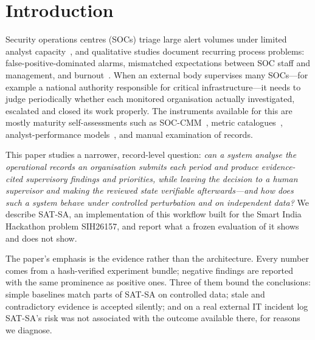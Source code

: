 \section{Introduction}
\label{sec:intro}

Security operations centres (SOCs) triage large alert volumes under limited analyst
capacity~\citep{vielberth2020soc,tariq2025alertfatigue}, and qualitative studies
document recurring process problems: false-positive-dominated alarms, mismatched
expectations between SOC staff and management, and burnout~\citep{alahmadi2022falsepositives,kokulu2019soc,sundaramurthy2015burnout}.
When an external body supervises many SOCs---for example a national authority
responsible for critical infrastructure---it needs to judge periodically whether
each monitored organisation actually investigated, escalated and closed its work
properly. The instruments available for this are mostly maturity self-assessments
such as SOC-CMM~\citep{vanos2016soccmm}, metric catalogues~\citep{forsberg2023metrics},
analyst-performance models~\citep{agyepong2023analyst}, and manual examination of
records.

This paper studies a narrower, record-level question: \emph{can a system analyse
the operational records an organisation submits each period and produce
evidence-cited supervisory findings and priorities, while leaving the decision
to a human supervisor and making the reviewed state verifiable afterwards---and
how does such a system behave under controlled perturbation and on independent
data?} We describe SAT-SA, an implementation of this workflow built for the Smart
India Hackathon problem SIH26157, and report what a frozen evaluation of it shows
and does not show.

The paper's emphasis is the evidence rather than the architecture. Every number
comes from a hash-verified experiment bundle; negative findings are reported with
the same prominence as positive ones. Three of them bound the conclusions:
simple baselines match parts of SAT-SA on controlled data; stale and contradictory
evidence is accepted silently; and on a real external IT incident log SAT-SA's risk
was not associated with the outcome available there, for reasons we diagnose.

